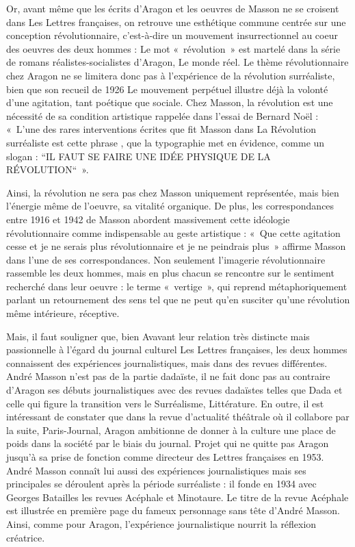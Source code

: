 Or, avant même que les écrits d’Aragon et les oeuvres de Masson ne se croisent dans Les Lettres françaises, on retrouve une esthétique commune centrée sur une conception révolutionnaire, c’est-à-dire un mouvement insurrectionnel au coeur des oeuvres des deux hommes : Le mot « révolution » est martelé dans la série de romans réalistes-socialistes d’Aragon, Le monde réel. Le thème révolutionnaire chez Aragon ne se limitera donc pas à l’expérience de la révolution surréaliste, bien que son recueil de 1926 Le mouvement perpétuel illustre déjà la volonté d’une agitation, tant poétique que sociale. Chez Masson, la révolution est une nécessité de sa condition artistique rappelée dans l’essai de Bernard Noël : « L’une des rares interventions écrites que fit Masson dans La Révolution surréaliste est cette phrase , que la typographie met en évidence, comme un slogan : “IL FAUT SE FAIRE UNE IDÉE PHYSIQUE DE LA RÉVOLUTION“ ». 

	Ainsi, la révolution ne sera pas chez Masson uniquement représentée, mais bien l’énergie même de l’oeuvre, sa vitalité organique. De plus, les correspondances  entre 1916 et 1942 de Masson abordent massivement cette idéologie  révolutionnaire comme indispensable au geste artistique : « Que cette agitation cesse et je ne serais plus révolutionnaire et je ne peindrais plus » affirme Masson dans l’une de ses correspondances. Non seulement l’imagerie révolutionnaire rassemble les deux hommes, mais en plus chacun se rencontre sur le sentiment recherché dans leur oeuvre : le terme « vertige », qui reprend métaphoriquement parlant un retournement des sens tel que ne peut qu’en susciter qu’une révolution même intérieure, réceptive.

	Mais, il faut souligner que, bien Avavant leur relation très distincte mais passionnelle à l’égard du journal culturel Les Lettres françaises, les deux hommes connaissent des expériences journalistiques, mais dans des revues différentes. André Masson n’est pas de la partie dadaïste, il ne fait donc pas au contraire d’Aragon ses débuts journalistiques avec des revues dadaïstes telles que Dada et celle qui figure la transition vers le Surréalisme, Littérature. En outre, il est intéressant de constater que dans la revue d’actualité théâtrale où il collabore par la suite, Paris-Journal, Aragon ambitionne de donner à la culture une place de poids dans la société par le biais du journal. Projet qui ne quitte pas Aragon jusqu’à sa prise de fonction comme directeur des Lettres françaises en 1953. André Masson connaît lui aussi des expériences journalistiques mais ses principales se déroulent après la période surréaliste : il fonde en 1934 avec Georges Batailles les revues Acéphale et Minotaure. Le titre de la revue Acéphale est illustrée en première page du fameux personnage sans tête d’André Masson. Ainsi, comme pour Aragon, l’expérience journalistique nourrit la réflexion créatrice. 

